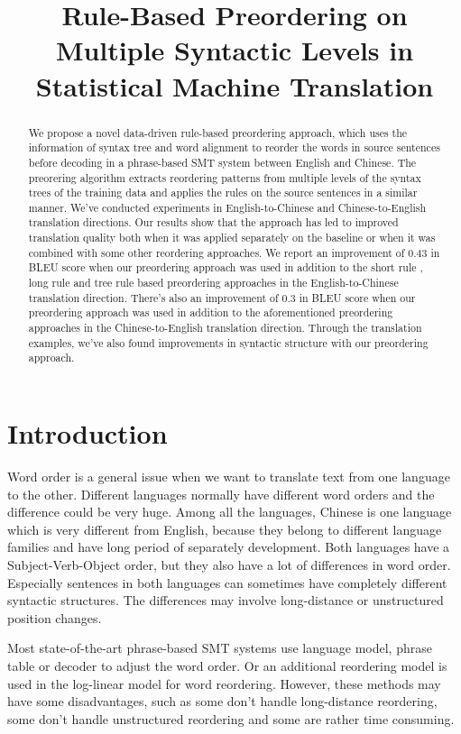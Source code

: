 \documentclass[a4paper]{article}
\title{Rule-Based Preordering on
Multiple Syntactic Levels in
Statistical Machine Translation}
\begin{document}
\maketitle
%
\begin{abstract}
We propose a novel data-driven rule-based preordering approach, which uses the information of syntax tree and word alignment to reorder the words in source sentences before decoding in a phrase-based SMT system between English and Chinese. The preorering algorithm extracts reordering patterns from multiple levels of the syntax trees of the training data and applies the rules on the source sentences in a similar manner. We've conducted experiments in English-to-Chinese and Chinese-to-English translation directions. Our results show that the approach has led to improved translation quality both when it was applied separately on the baseline or when it was combined with some other reordering approaches. We report an improvement of $0.43$ in BLEU score when our preordering approach was used in addition to the short rule \cite{short}, long rule\cite{long} and tree rule \cite{tree} based preordering approaches in the English-to-Chinese translation direction. There's also an improvement of $0.3$ in BLEU score when our preordering approach was used in addition to the aforementioned preordering approaches in the Chinese-to-English translation direction. Through the translation examples, we've also found improvements in syntactic structure with our preordering approach.
\end{abstract}
%
\section{Introduction}

Word order is a general issue when we want to translate text from one language to the other. Different languages normally have different word orders and the difference could be very huge. Among all the languages, Chinese is one language which is very different from English, because they belong to different language families and have long period of separately development. Both languages have a Subject-Verb-Object order, but they also have a lot of differences in word order. Especially sentences in both languages can sometimes have completely different syntactic structures. The differences may involve long-distance or unstructured position changes.

Most state-of-the-art phrase-based SMT systems use language model, phrase table or decoder to adjust the word order. Or an additional reordering model is used in the log-linear model for word reordering. However, these methods may have some disadvantages, such as some don't handle long-distance reordering, some don't handle unstructured reordering and some are rather time consuming.
\end{document}
